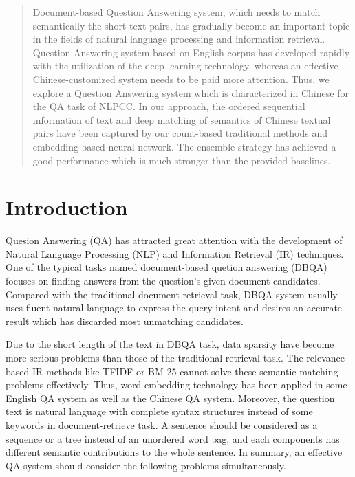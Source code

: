 \documentclass{llncs}
\begin{document}
\begin{abstract}
Document-based Question Answering system, which needs to match semantically the short text pairs, has gradually become an important topic in the fields of natural language processing and information retrieval. Question Answering system based on English corpus has developed rapidly with the utilization of the deep learning technology, whereas an effective Chinese-customized system needs to be paid more attention. Thus, we explore a Question Answering system which is characterized in Chinese for the  QA task of NLPCC. In our approach, the ordered sequential information of text and deep matching of semantics of Chinese textual pairs have been captured by our count-based traditional methods and embedding-based neural network. The ensemble strategy has achieved a good performance which is much stronger than the provided baselines. 

\end{abstract}
%
\section{Introduction}
Quesion Answering (QA) has attracted great attention with the development of Natural Language Processing (NLP) and Information Retrieval (IR) techniques. One of the typical tasks named document-based quetion answering (DBQA) focuses on finding answers from the question's given document candidates.
Compared with the traditional document retrieval task, DBQA system usually uses fluent natural language to express the query intent and desires an accurate result which has discarded most unmatching candidates. 

Due to the short length of the text in DBQA task, data sparsity  have become more serious problems than those of the traditional retrieval task. The relevance-based IR methods like TFIDF or BM-25 cannot solve these semantic matching problems effectively. Thus, word embedding technology \cite{Mikolov2013Efficient} has been applied in some English QA system as well as the Chinese QA system. Moreover, the question text is natural language with complete syntax structures instead of some keywords in document-retrieve task. A sentence should be considered as a sequence or a tree instead of an unordered word bag, and each components has different semantic contributions to the whole sentence. In summary, an effective QA system should consider the following problems simultaneously.
\end{document}

